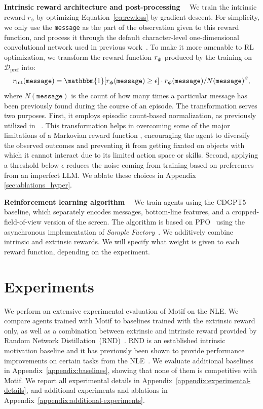 \documentclass{article} %
\begin{document}
\textbf{Intrinsic reward architecture and post-processing}~~
We train the intrinsic reward $r_\phi$ by optimizing Equation~\ref{eq:rewloss} by gradient descent.
For simplicity, we only use the \texttt{message} as the part of the observation given to this reward function, and process it through the default character-level one-dimensional convolutional network used in previous work~\citep{HenaffRJR22}.
To make it more amenable to RL optimization, we transform the reward function $r_{\bm{\phi}}$ produced by the training on $\mathcal{D}_\text{pref}$ into:
\begin{equation}
r_\text{int} (\texttt{message}) = \mathbbm{1}[ r_\vphi( \texttt{message} ) \geq \epsilon ] \cdot  r_\vphi( \texttt{message} )/ N(\texttt{message})^{\beta},
\label{eq:rint}
\end{equation}
where $N(\texttt{message})$ is the count of how many times a particular message has been previously found during the course of an episode.
The transformation serves two purposes. First, it employs episodic count-based normalization, as previously utilized in ~\citet{Raileanu2020RIDE,MuNeurips2022,ZhangNeurips21}. This transformation helps in overcoming some of the major limitations of a Markovian reward function \citep{abel2021expressivity}, encouraging the agent to diversify the observed outcomes and preventing it from getting fixated on  objects with which it cannot interact due to its limited action space or skills. Second, applying a threshold below $\epsilon$ reduces the noise coming from training based on preferences from an imperfect LLM. We ablate these choices in Appendix \ref{sec:ablations_hyper}.

\textbf{Reinforcement learning algorithm}~~
We train agents using the CDGPT5 baseline, which separately encodes messages, bottom-line features, and a cropped-field-of-view version of the screen. The algorithm is based on PPO~\citep{schulman2017proximal} using the asynchronous implementation of \textit{Sample Factory}~\citep{petrenko2020sf}.
We additively combine intrinsic and extrinsic rewards.
We will specify what weight is given to each reward function, depending on the experiment.



\section{Experiments}
We perform an extensive experimental evaluation of Motif on the NLE. 
We compare agents trained with Motif to baselines trained with the extrinsic reward only, as well as a combination between extrinsic and intrinsic reward provided by Random Network Distillation~(RND)~\citep{burda2018exploration}. 
RND is an established intrinsic motivation baseline and it has previously been shown to provide performance improvements on certain tasks from the NLE~\citep{KuttlerNMRSGR20}.
We evaluate additional baselines in Appendix~\ref{appendix:baselines}, showing that none of them is competitive with Motif.
We report all experimental details in Appendix~\ref{appendix:experimental-details}, and additional experiments and ablations in Appendix~\ref{appendix:additional-experiments}.
\end{document}
